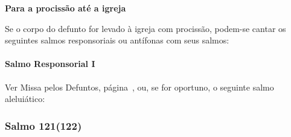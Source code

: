 \AllowPageFlush

\begin{center}
  \textbf{\large Para a procissão até a igreja}
\end{center}

\begin{rubrica}
  Se o corpo do defunto for levado à igreja com procissão, podem-se cantar os seguintes salmos responsoriais ou antífonas com seus salmos:
\end{rubrica}

\paragraph{Salmo Responsorial I}
\begin{rubrica}
  Ver Missa pelos Defuntos, página~\pageref{subsection:liturgia-defunctorum/missa-pro-defunctis/psalmus-responsorius-2}, ou, se for oportuno, o seguinte salmo aleluiático:
\end{rubrica}
\subsubsection{Salmo 121(122)}
